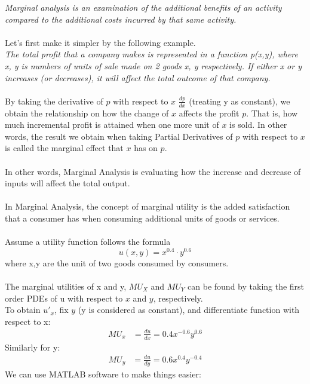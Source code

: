 \documentclass[a4paper]{article}
\begin{document}
	\textit{Marginal analysis is an examination of the additional benefits of an activity compared to the additional costs incurred by that same activity.} \\ \\
	Let's first make it simpler by the following example. \\
	\emph{The total profit that a company makes is represented in a function p(x,y), where x, y is numbers of units of sale made on 2 goods x, y respectively. If either x or y increases (or decreases), it will affect the total outcome of that company.} \\ \\
	By taking the derivative of $p$ with respect to $x$ $\frac{dp}{dx}$ (treating y as constant), we obtain the relationship on how the change of $x$ affects the profit $p$. That is, how much incremental profit is attained when one more unit of $x$ is sold. In other words, the result we obtain when taking Partial Derivatives of $p$ with respect to $x$ is called the marginal effect that $x$ has on $p$. \\ \\
	In other words, Marginal Analysis is evaluating how the increase and decrease of inputs will affect the total output.\\ \\
	In Marginal Analysis, the concept of marginal utility is the added satisfaction that a consumer has when consuming additional units of goods or services. \\ \\
	Assume a utility function follows the formula
	\begin{equation*}
	u(x,y) = x^{0.4}\cdot y^{0.6}
	\end{equation*} 
	where x,y are the unit of two goods consumed by consumers.\\ \\
	The marginal utilities of x and y, $MU_X$ and $MU_Y$ can be found by taking the first order PDEs of u with respect to $x$ and $y$, respectively.\\
	To obtain $u'_x$, fix $y$ (y is considered as constant), and differentiate function with respect to x: 
	\begin{align*}
	MU_x & = \frac{du}{dx} = 0.4x^{-0.6}y^{0.6} 
	\end{align*}
	Similarly for y:
	\begin{align*}
	MU_y & = \frac{du}{dy} = 0.6x^{0.4}y^{-0.4}
	\end{align*}
	We can use MATLAB software to make things easier:
\end{document}
